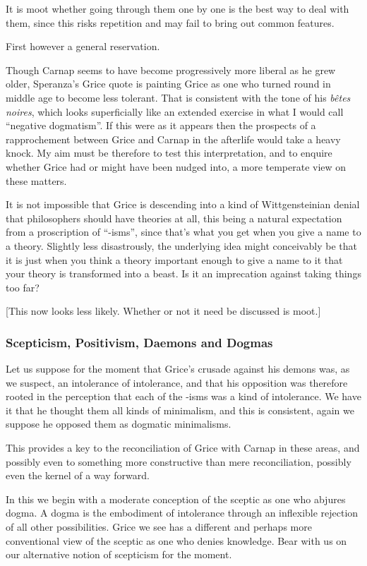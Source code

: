 \documentclass[10pt,titlepage]{book}
\begin{document}
It is moot whether going through them one by one is the best way to deal with them, since this risks repetition and may fail to bring out common features.

First however a general reservation.

Though Carnap seems to have become progressively more liberal as he grew older, Speranza's Grice quote is painting Grice as one who turned round in middle age to become less tolerant.
That is consistent with the tone of his {\it b\^etes noires}, which looks superficially like an extended exercise in what I would call ``negative dogmatism''.
If this were as it appears then the prospects of a rapprochement between Grice and Carnap in the afterlife would take a heavy knock.
My aim must be therefore to test this interpretation, and to enquire whether Grice had or might have been nudged into, a more temperate view on these matters. 

It is not impossible that Grice is descending into a kind of Wittgensteinian denial that philosophers should have theories at all, this being a natural expectation from a proscription of ``-isms'', since that's what you get when you give a name to a theory.
Slightly less disastrously, the underlying idea might conceivably be that it is just when you think a theory important enough to give a name to it that your theory is transformed into a beast.
Is it an imprecation against taking things too far?

[This now looks less likely.  Whether or not it need be discussed is moot.]

\subsubsection{Scepticism, Positivism, Daemons and Dogmas}

Let us suppose for the moment that Grice's crusade against his demons was, as we suspect, an intolerance of intolerance, and that his opposition was therefore rooted in the perception that each of the -isms was a kind of intolerance.
We have it that he thought them all kinds of minimalism, and this is consistent, again we suppose he opposed them as dogmatic minimalisms.

This provides a key to the reconciliation of Grice with Carnap in these areas, and possibly even to something more constructive than mere reconciliation, possibly even the kernel of a way forward.

In this we begin with a moderate conception of the sceptic as one who abjures dogma.
A dogma is the embodiment of intolerance through an inflexible rejection of all other possibilities.
Grice we see has a different and perhaps more conventional view of the sceptic as one who denies knowledge.
Bear with us on our alternative notion of scepticism for the moment.
\end{document}
